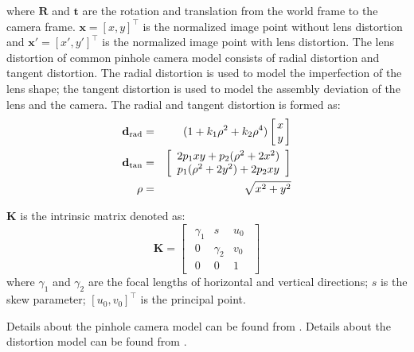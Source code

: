 \documentclass{report}
\begin{document}
where $\mathbf{R}$ and $\mathbf{t}$ are the rotation and translation from the world frame to the camera frame. $\mathbf{x} = [x, y]^\top$ is the normalized image point without lens distortion and $\mathbf{x}' = [x', y']^\top$ is the normalized image point with lens distortion. The lens distortion of common pinhole camera model consists of radial distortion and tangent distortion. The radial distortion is used to model the imperfection of the lens shape; the tangent distortion is used to model the assembly deviation of the lens and the camera. The radial and tangent distortion is formed as: 
\begin{eqnarray}
\mathbf{d}_\text{rad}
&=&
(1 + k_1 \rho^2 + k_2 \rho^4) 
\arraycolsep=1.5pt%
\begin{bmatrix}
	\begin{array}{c}
	x \\ y
	\end{array}
\end{bmatrix} \\
\mathbf{d}_\text{tan} 
&=&
\begin{bmatrix}
	\begin{array}{c}
	2 p_1 x y + p_2 (\rho^2 + 2 x^2) \\ 
	p_1 (\rho^2 + 2 y^2) + 2 p_2 x y
	\end{array}
\end{bmatrix} \\
\rho &=& \sqrt{x^2 + y^2}
\end{eqnarray}

$\mathbf{K}$ is the intrinsic matrix denoted as: 
\begin{equation}
\mathbf{K} = 
\begin{bmatrix}
	\begin{array}{ccc}
	\gamma_1 & s & u_0 \\ 
	0 & \gamma_2 & v_0 \\ 	
	0 & 0 & 1
	\end{array}
\end{bmatrix}
\label{kEqn}
\end{equation}
where $\gamma_1$ and $\gamma_2$ are the focal lengths of horizontal and vertical directions; $s$ is the skew parameter; $[u_0, v_0]^\top$ is the principal point. 

Details about the pinhole camera model can be found from \cite{hartley2000multiple}. Details about the distortion model can be found from \cite{heikkila1997four}. 
\end{document}
